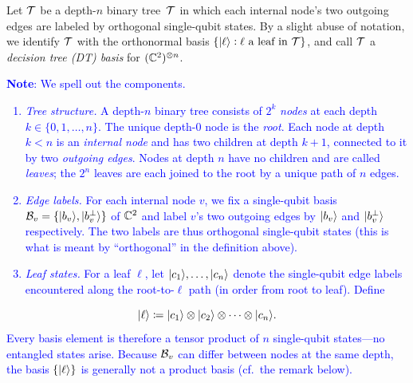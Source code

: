 \begin{definition}
    Let $\mathcal{T}$ be a depth-$n$ binary tree~$\mathcal{T}$ in which each internal node's two outgoing edges are labeled by orthogonal single-qubit states. 
    By a slight abuse of notation, we identify $\mathcal{T}$ with the orthonormal basis $\{\lvert\ell\rangle : \ell \text{ a leaf in } \mathcal{T}\}$, and call $\mathcal{T}$ a \emph{decision tree (DT) basis} for $(\mathbb{C}^2)^{\otimes n}$.

    \textcolor{blue}{\textbf{Note}: We spell out the components.
    \begin{enumerate}
        \item \emph{Tree structure.} A depth-$n$ binary tree consists of $2^k$ \emph{nodes} at each depth $k \in \{0, 1, \ldots, n\}$. The unique depth-$0$ node is the \emph{root}. Each node at depth $k < n$ is an \emph{internal node} and has two children at depth $k+1$, connected to it by two \emph{outgoing edges}. Nodes at depth $n$ have no children and are called \emph{leaves}; the $2^n$ leaves are each joined to the root by a unique path of $n$ edges.
        \item \emph{Edge labels.} For each internal node $v$, we fix a single-qubit basis $\mathcal{B}_v = \{\lvert b_v\rangle, \lvert b_v^\bot\rangle\}$ of $\mathbb{C}^2$ and label $v$'s two outgoing edges by $\lvert b_v\rangle$ and $\lvert b_v^\bot\rangle$ respectively. The two labels are thus orthogonal single-qubit states (this is what is meant by ``orthogonal'' in the definition above).
        \item \emph{Leaf states.} For a leaf $\ell$, let $\lvert c_1\rangle, \ldots, \lvert c_n\rangle$ denote the single-qubit edge labels encountered along the root-to-$\ell$ path (in order from root to leaf). Define
    \end{enumerate}
    \[
        \lvert\ell\rangle \coloneqq \lvert c_1\rangle \otimes \lvert c_2\rangle \otimes \cdots \otimes \lvert c_n\rangle.
    \]
    Every basis element is therefore a tensor product of $n$ single-qubit states---no entangled states arise. Because $\mathcal{B}_v$ can differ between nodes at the same depth, the basis $\{\lvert\ell\rangle\}$ is generally not a product basis (cf.\ the remark below).
    }
\end{definition}
